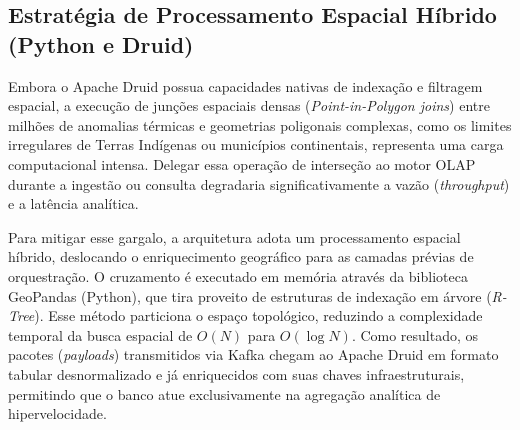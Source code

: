 

\subsection{Estratégia de Processamento Espacial Híbrido (Python e Druid)}

Embora o Apache Druid possua capacidades nativas de indexação e filtragem espacial, a execução de junções espaciais densas (\textit{Point-in-Polygon joins}) entre milhões de anomalias térmicas e geometrias poligonais complexas, como os limites irregulares de Terras Indígenas ou municípios continentais, representa uma carga computacional intensa. Delegar essa operação de interseção ao motor OLAP durante a ingestão ou consulta degradaria significativamente a vazão (\textit{throughput}) e a latência analítica.

Para mitigar esse gargalo, a arquitetura adota um processamento espacial híbrido, deslocando o enriquecimento geográfico para as camadas prévias de orquestração. O cruzamento é executado em memória através da biblioteca GeoPandas (Python), que tira proveito de estruturas de indexação em árvore (\textit{R-Tree}). Esse método particiona o espaço topológico, reduzindo a complexidade temporal da busca espacial de $O(N)$ para $O(\log N)$. Como resultado, os pacotes (\textit{payloads}) transmitidos via Kafka chegam ao Apache Druid em formato tabular desnormalizado e já enriquecidos com suas chaves infraestruturais, permitindo que o banco atue exclusivamente na agregação analítica de hipervelocidade.
